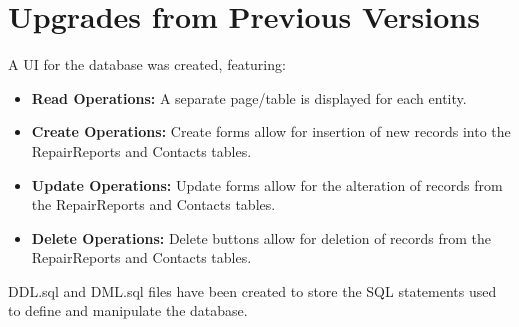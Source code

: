 \documentclass{article}
\begin{document}
\section{Upgrades from Previous Versions}

\begin{tcolorbox}[colback=secondarycolor, colframe=primarycolor, arc=5mm, title=\textbf{Step 2 --> Step 3}]
A UI for the database was created, featuring:
\vspace{0.2cm}
\begin{itemize}
  \item \textbf{Read Operations:} A separate page/table is displayed for each entity.
  \vspace{0.1cm}
  \item \textbf{Create Operations:} Create forms allow for insertion of new records into the RepairReports and Contacts tables.
  \vspace{0.1cm}
  \item \textbf{Update Operations:} Update forms allow for the alteration of records from the RepairReports and Contacts tables.
  \vspace{0.1cm}
  \item \textbf{Delete Operations:} Delete buttons allow for deletion of records from the RepairReports and Contacts tables.
  \end{itemize}
\vspace{0.2cm}
DDL.sql and DML.sql files have been created to store the SQL statements used to define and manipulate the database.
\end{tcolorbox}
\end{document}
